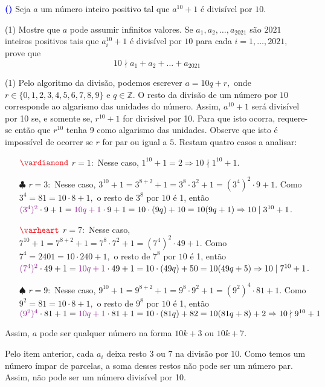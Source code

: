 \documentclass[12pt, a4paper]{article}
\newcommand{\negrito}[1]{\mbox{\boldmath{$#1$}}}
\newcounter{exercicio}[section]
\newenvironment{exercicio}[1][]{\refstepcounter{exercicio}\par\medskip
 \textcolor{blue}{\bf(\theexercicio)} \rmfamily}{\medskip }
\newcommand{\itens}[1]{\begin{tasks}[label={(tsk[a])},label-width=3.6ex, label-format = {\bfseries}, column-sep = {0pt}](1) #1\end{tasks}}
\newcommand{\alt}[1]{\textcolor{Floresta}{$\negrito{(#1)} $}}
\begin{document}
\begin{exercicio}
Seja $a$ um número inteiro positivo tal que $a^{10} + 1$ é divisível por $10.$
\itens{
\task[\alt{a}] Mostre que $a$ pode assumir infinitos valores.
\task[\alt{b}] Se $a_1, a_2, \ldots, a_{2021}$ são $2021$ inteiros positivos tais que $a_i^{10} + 1$ é divisível por $10$ para cada $i = 1, \ldots, 2021,$ prove que 
\[
10 \nmid a_1 + a_2 + \ldots + a_{2021}
\]
}
\end{exercicio}
\begin{solution}
\itens{
\task[\alt{a}] Pelo algoritmo da divisão, podemos escrever $a = 10q + r,$ onde $r \in \{0, 1,2,3,4,5,6,7,8,9 \}$ e $q \in \mathbb{Z}.$ O resto da divisão de um número por $10$ corresponde ao algarismo das unidades do número. Assim, $a^{10} + 1$ será divisível por 10 se, e somente se, $r^{10} + 1$ for divisível por 10. Para que isto ocorra, requere-se então que $r^{10}$ tenha 9 como algarismo das unidades. Observe que isto é impossível de ocorrer se $r$ for par ou igual a $5.$ Restam quatro casos a analisar:
\begin{itemize}
    \item[$\textcolor{Red}{\vardiamond}$] $r = 1:$ Nesse caso, $1^{10} + 1 = 2 \Rightarrow 10 \nmid 1^{10} + 1$.
    \item[$\clubsuit$] $r = 3:$ Nesse caso, $3^{10} + 1 = 3^{8+2} + 1 = 3^8 \cdot 3^2 + 1 = (3^4)^2 \cdot 9 + 1.$
    Como $3^4 = 81 = 10 \cdot 8 + 1,$ o resto de $3^8$ por $10$ é 1, então $\textcolor{Plum}{(3^4)^2} \cdot 9 + 1 = \textcolor{Plum}{10q + 1} \cdot 9 + 1 = 10 \cdot (9q) + 10 = 10(9q+1) \Rightarrow 10 \mid 3^{10} + 1$.
    \item[$\textcolor{Red}{\varheart}$] $r = 7:$ Nesse caso, $7^{10} + 1 = 7^{8+2} + 1 = 7^8 \cdot 7^2 + 1 = (7^4)^2 \cdot 49 + 1.$
    Como $7^4 = 2401 = 10 \cdot 240 + 1,$ o resto de $7^8$ por $10$ é 1, então $\textcolor{Plum}{(7^4)^2} \cdot 49 + 1 = \textcolor{Plum}{10q + 1} \cdot 49 + 1 = 10 \cdot (49q) + 50 = 10(49q+5) \Rightarrow 10 \mid 7^{10} + 1$.
    \item[$\spadesuit$] $r = 9:$ Nesse caso, $9^{10} + 1 = 9^{8+2} + 1 = 9^8 \cdot 9^2 + 1 = (9^2)^4 \cdot 81 + 1.$
    Como $9^2 = 81 = 10 \cdot 8 + 1,$ o resto de $9^8$ por $10$ é 1, então $\textcolor{Plum}{(9^2)^4} \cdot 81 + 1 = \textcolor{Plum}{10q + 1} \cdot 81 + 1 = 10 \cdot (81q) + 82 = 10(81q+8)+2 \Rightarrow 10 \nmid 9^{10} + 1$
\end{itemize}
Assim, $a$ pode ser qualquer número na forma $10k + 3$ ou $10k + 7.$

\task[\alt{b}] Pelo item anterior, cada $a_i$ deixa resto $3$ ou $7$ na divisão por $10.$ Como temos um número ímpar de parcelas, a soma desses restos não pode ser um número par. Assim, não pode ser um número divisível por 10.
}
\end{solution}
 
\end{document}
